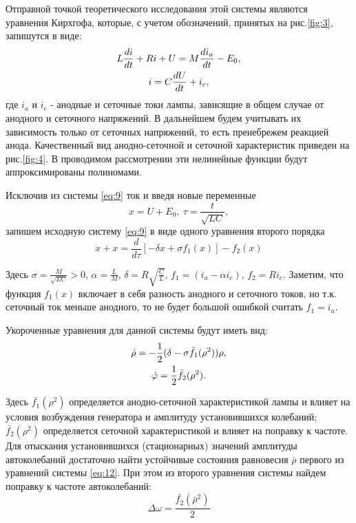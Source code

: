 Отправной точкой теоретического исследования этой системы являются уравнения Кирхгофа, которые, с учетом обозначений, принятых на рис.\ref{fig:3}, запишутся в виде:
\begin{gather}
\label{eq:9}
L\frac{di}{dt}+Ri+U=M\frac{di_a}{dt}-E_0,\\\notag
i=C\frac{dU}{dt}+i_c,
\end{gather}
где $i_a$ и $i_c$ - анодные и сеточные токи лампы, зависящие в общем случае от анодного и сеточного напряжений. В дальнейшем будем учитывать их зависимость только от сеточных напряжений, то есть пренебрежем реакцией анода. Качественный вид анодно-сеточной и сеточной характеристик приведен на рис.\ref{fig:4}. В проводимом рассмотрении эти нелинейные функции будут аппроксимированы полиномами. 

Исключив из системы \eqref{eq:9} ток и введя новые переменные
\begin{equation}
\label{eq:10}
x=U+E_0, ~ \tau=\frac{t}{\sqrt{LC}},
\end{equation}
запишем исходную систему  \eqref{eq:9} в виде одного уравнения второго порядка
\begin{equation}
\label{eq:11}
\ddot{x}+x=\frac{d}{d\tau}[-\delta x+\sigma f_1(x)]-f_2(x)
\end{equation}

Здесь $\sigma=\frac{M}{\sqrt{LC}}>0$, $\alpha=\frac{L}{M}$, $\delta=R\sqrt{\frac{C}{L}}$, $f_1=(i_a-\alpha i_c)$, $f_2=Ri_c$. Заметим, что функция $f_1(x)$ включает в себя разность анодного и сеточного токов, но т.к. сеточный ток меньше анодного, то не будет большой ошибкой считать $f_1=i_a$.

Укороченные уравнения для данной системы будут иметь вид:
\begin{gather}
\label{eq:12}
\dot\rho=-\frac{1}{2} (\delta-\sigma \bar{f_1}(\rho^2))\rho,\\\notag
\dot\varphi=\frac{1}{2}\bar{f_2}(\rho^2).
\end{gather}

Здесь $\bar{f_1}(\rho^2)$  определяется анодно-сеточной характеристикой лампы и влияет на условия возбуждения генератора и амплитуду установившихся колебаний;  $\bar{f_2}(\rho^2)$ определяется сеточной характеристикой и влияет на поправку к частоте. Для отыскания установившихся (стационарных) значений амплитуды автоколебаний достаточно найти устойчивые состояния равновесия  $\bar{\rho}$  первого из уравнений системы \eqref{eq:12}. При этом из второго уравнения системы найдем поправку к частоте автоколебаний:
\begin{equation}
\label{eq:13}
\Delta \omega=\frac{\bar{f_2}(\bar{\rho}^2)}{2}
\end{equation}

